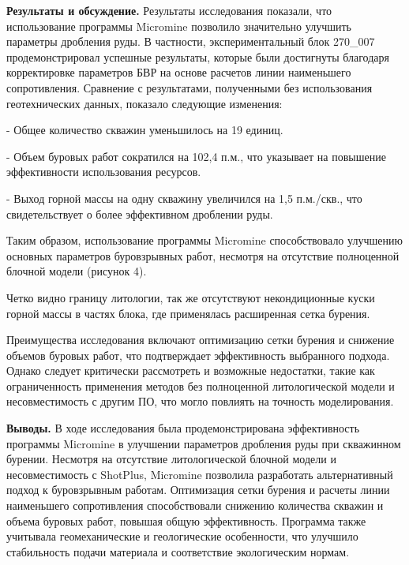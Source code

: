\begin{multicols}{2}
{\bfseries Результаты и обсуждение.} Результаты исследования показали, что
использование программы Micromine позволило значительно улучшить
параметры дробления руды. В частности, экспериментальный блок 270\_007
продемонстрировал успешные результаты, которые были достигнуты благодаря
корректировке параметров БВР на основе расчетов линии наименьшего
сопротивления. Сравнение с результатами, полученными без использования
геотехнических данных, показало следующие изменения:

- Общее количество скважин уменьшилось на 19 единиц.

- Объем буровых работ сократился на 102,4 п.м., что указывает на
повышение эффективности использования ресурсов.

- Выход горной массы на одну скважину увеличился на 1,5 п.м./скв., что
свидетельствует о более эффективном дроблении руды.

Таким образом, использование программы Micromine способствовало
улучшению основных параметров буровзрывных работ, несмотря на отсутствие
полноценной блочной модели (рисунок 4).


Четко видно границу литологии, так же отсутствуют некондиционные куски
горной массы в частях блока, где применялась расширенная сетка бурения.

Преимущества исследования включают оптимизацию сетки бурения и снижение
объемов буровых работ, что подтверждает эффективность выбранного
подхода. Однако следует критически рассмотреть и возможные недостатки,
такие как ограниченность применения методов без полноценной
литологической модели и несовместимость с другим ПО, что могло повлиять
на точность моделирования.

{\bfseries Выводы.} В ходе исследования была продемонстрирована
эффективность программы Micromine в улучшении параметров дробления руды
при скважинном бурении. Несмотря на отсутствие литологической блочной
модели и несовместимость с ShotPlus, Micromine позволила разработать
альтернативный подход к буровзрывным работам. Оптимизация сетки бурения
и расчеты линии наименьшего сопротивления способствовали снижению
количества скважин и объема буровых работ, повышая общую эффективность.
Программа также учитывала геомеханические и геологические особенности,
что улучшило стабильность подачи материала и соответствие экологическим
нормам.
\end{multicols}


